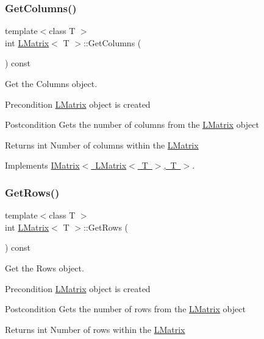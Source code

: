 \subsubsection{\texorpdfstring{GetColumns()}{GetColumns()}}
{\footnotesize\ttfamily template$<$class T $>$ \\
int \mbox{\hyperlink{class_l_matrix}{L\+Matrix}}$<$ T $>$\+::Get\+Columns (\begin{DoxyParamCaption}{ }\end{DoxyParamCaption}) const\hspace{0.3cm}{\ttfamily [virtual]}}



Get the Columns object. 

\begin{DoxyPrecond}{Precondition}
\mbox{\hyperlink{class_l_matrix}{L\+Matrix}} object is created 
\end{DoxyPrecond}
\begin{DoxyPostcond}{Postcondition}
Gets the number of columns from the \mbox{\hyperlink{class_l_matrix}{L\+Matrix}} object 
\end{DoxyPostcond}
\begin{DoxyReturn}{Returns}
int Number of columns within the \mbox{\hyperlink{class_l_matrix}{L\+Matrix}} 
\end{DoxyReturn}


Implements \mbox{\hyperlink{class_i_matrix_a3b84da3898ef38bdf281c13f218fc278}{I\+Matrix$<$ L\+Matrix$<$ T $>$, T $>$}}.

\mbox{\label{class_l_matrix_ad4ed9d329dbd01d010504a97b3879442}} 
\subsubsection{\texorpdfstring{GetRows()}{GetRows()}}
{\footnotesize\ttfamily template$<$class T $>$ \\
int \mbox{\hyperlink{class_l_matrix}{L\+Matrix}}$<$ T $>$\+::Get\+Rows (\begin{DoxyParamCaption}{ }\end{DoxyParamCaption}) const\hspace{0.3cm}{\ttfamily [virtual]}}



Get the Rows object. 

\begin{DoxyPrecond}{Precondition}
\mbox{\hyperlink{class_l_matrix}{L\+Matrix}} object is created 
\end{DoxyPrecond}
\begin{DoxyPostcond}{Postcondition}
Gets the number of rows from the \mbox{\hyperlink{class_l_matrix}{L\+Matrix}} object 
\end{DoxyPostcond}
\begin{DoxyReturn}{Returns}
int Number of rows within the \mbox{\hyperlink{class_l_matrix}{L\+Matrix}} 
\end{DoxyReturn}


